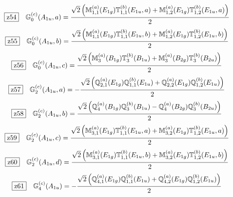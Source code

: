 \documentclass[fleqn,10pt,landscape]{jsarticle}
\begin{document}
\begin{dmath*}
\hspace*{3mm}\fbox{z54}\quad \mathbb{G}_{0}^{(c)}(A_{1u},a)=\frac{\sqrt{2} \left(\mathbb{M}_{1,1}^{(a)}(E_{1g}) \mathbb{T}_{1,1}^{(b)}(E_{1u},a) + \mathbb{M}_{1,2}^{(a)}(E_{1g}) \mathbb{T}_{1,2}^{(b)}(E_{1u},a)\right)}{2}
\end{dmath*}
\begin{dmath*}
\hspace*{3mm}\fbox{z55}\quad \mathbb{G}_{0}^{(c)}(A_{1u},b)=\frac{\sqrt{2} \left(\mathbb{M}_{1,1}^{(a)}(E_{1g}) \mathbb{T}_{1,1}^{(b)}(E_{1u},b) + \mathbb{M}_{1,2}^{(a)}(E_{1g}) \mathbb{T}_{1,2}^{(b)}(E_{1u},b)\right)}{2}
\end{dmath*}
\begin{dmath*}
\hspace*{3mm}\fbox{z56}\quad \mathbb{G}_{0}^{(c)}(A_{1u},c)=\frac{\sqrt{2} \left(\mathbb{M}_{3}^{(a)}(B_{1g}) \mathbb{T}_{3}^{(b)}(B_{1u}) + \mathbb{M}_{3}^{(a)}(B_{2g}) \mathbb{T}_{3}^{(b)}(B_{2u})\right)}{2}
\end{dmath*}
\begin{dmath*}
\hspace*{3mm}\fbox{z57}\quad \mathbb{G}_{2}^{(c)}(A_{1u},a)=- \frac{\sqrt{2} \left(\mathbb{Q}_{2,1}^{(a)}(E_{1g}) \mathbb{Q}_{1,1}^{(b)}(E_{1u}) + \mathbb{Q}_{2,2}^{(a)}(E_{1g}) \mathbb{Q}_{1,2}^{(b)}(E_{1u})\right)}{2}
\end{dmath*}
\begin{dmath*}
\hspace*{3mm}\fbox{z58}\quad \mathbb{G}_{2}^{(c)}(A_{1u},b)=\frac{\sqrt{2} \left(\mathbb{Q}_{4}^{(a)}(B_{1g}) \mathbb{Q}_{3}^{(b)}(B_{1u}) - \mathbb{Q}_{4}^{(a)}(B_{2g}) \mathbb{Q}_{3}^{(b)}(B_{2u})\right)}{2}
\end{dmath*}
\begin{dmath*}
\hspace*{3mm}\fbox{z59}\quad \mathbb{G}_{2}^{(c)}(A_{1u},c)=\frac{\sqrt{2} \left(\mathbb{M}_{3,1}^{(a)}(E_{1g}) \mathbb{T}_{1,1}^{(b)}(E_{1u},a) + \mathbb{M}_{3,2}^{(a)}(E_{1g}) \mathbb{T}_{1,2}^{(b)}(E_{1u},a)\right)}{2}
\end{dmath*}
\begin{dmath*}
\hspace*{3mm}\fbox{z60}\quad \mathbb{G}_{2}^{(c)}(A_{1u},d)=\frac{\sqrt{2} \left(\mathbb{M}_{3,1}^{(a)}(E_{1g}) \mathbb{T}_{1,1}^{(b)}(E_{1u},b) + \mathbb{M}_{3,2}^{(a)}(E_{1g}) \mathbb{T}_{1,2}^{(b)}(E_{1u},b)\right)}{2}
\end{dmath*}
\begin{dmath*}
\hspace*{3mm}\fbox{z61}\quad \mathbb{G}_{4}^{(c)}(A_{1u})=- \frac{\sqrt{2} \left(\mathbb{Q}_{4,1}^{(a)}(E_{1g}) \mathbb{Q}_{1,1}^{(b)}(E_{1u}) + \mathbb{Q}_{4,2}^{(a)}(E_{1g}) \mathbb{Q}_{1,2}^{(b)}(E_{1u})\right)}{2}
\end{dmath*}
\end{document}
